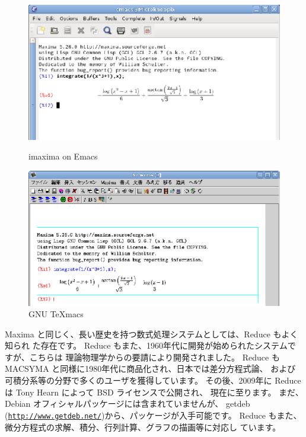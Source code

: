\documentclass[mingoth,a4paper]{jsarticle}
\begin{document}
\begin{center}
\begin{figure}[ht]
\begin{minipage}[c]{8cm}
  \includegraphics[width=1\hsize]{image2012-gum/imaxima.eps}
  \caption{imaxima on Emacs}
  \label{fig:imaxima}
\end{minipage}
\begin{minipage}[c]{8cm}
  \includegraphics[width=1\hsize]{image2012-gum/texmacs.eps}
  \caption{GNU TeXmacs}
  \label{fig:texmacs}
\end{minipage}
\end{figure}
\end{center}

Maxima と同じく、長い歴史を持つ数式処理システムとしては、Reduce もよく知られ
た存在です。
Reduce もまた、1960年代に開発が始められたシステムですが、こちらは
理論物理学からの要請により開発されました。
Reduce も MACSYMA と同様に1980年代に商品化され、日本では差分方程式論、
および可積分系等の分野で多くのユーザを獲得しています。
その後、2009年に Reduce は Tony Hearn によって BSD ライセンスで公開され、
現在に至ります。
まだ、Debian オフィシャルパッケージには含まれていませんが、
getdeb ({\tt \url{http://www.getdeb.net/}})から、パッケージが入手可能です。
Reduce もまた、微分方程式の求解、積分、行列計算、グラフの描画等に対応し
ています。
\end{document}
